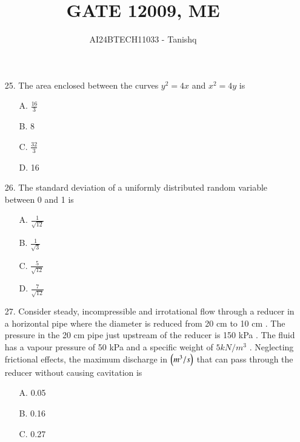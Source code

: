 \documentclass[journal]{IEEEtran}
\begin{document}

\vspace{3cm}


\author{AI24BTECH11033 - Tanishq}
\title{GATE 1}
{\let\newpage\relax\maketitle}
\title{2009, ME}
\renewcommand{\thefigure}{\theenumi}
\renewcommand{\thetable}{\theenumi}
\setlength{\intextsep}{10pt} %
\renewcommand{\thetable}{\theenumi}
\begin{enumerate}
    \item[25.] The area enclosed between the curves $ y^2=4x $ and $ x^2=4y $ is
    \begin{enumerate}
    \item [A.] $\frac{16}{3}$
    \item [B.] 8
    \item [C.] $\frac{32}{3}$
    \item [D.] 16
  \end{enumerate}
  \item[26.] The standard deviation of a uniformly distributed random variable between 0 and 1 is
    \begin{enumerate}
    \item [A.] $\frac{1}{\sqrt{12}}$
    \item [B.] $\frac{1}{\sqrt{3}}$
    \item [C.] $\frac{5}{\sqrt{12}}$
    \item [D.] $\frac{7}{\sqrt{12}}$
  \end{enumerate}
  \item[27.] Consider steady, incompressible and irrotational flow through a reducer in a horizontal pipe where the diameter is reduced from 20 cm to 10 cm . The pressure in the 20 cm pipe just upstream of the reducer is 150 kPa . The fluid has a vapour pressure of 50 kPa  and a specific weight of $5 kN/m^3$ . Neglecting frictional effects, the maximum discharge in $\left(m^3/s\right)$ that can pass through the reducer without causing cavitation is
   \begin{enumerate}
    \item [A.] 0.05
    \item [B.] 0.16
    \item [C.] 0.27

\end{enumerate}
\end{enumerate}
\end{document}
